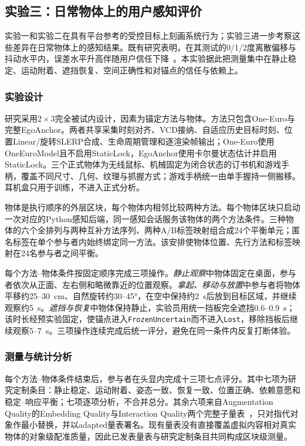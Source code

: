 \documentclass[review]{vgtc}
\begin{document}
\subsection{实验三：日常物体上的用户感知评价}

实验一和实验二在具有平台参考的受控目标上刻画系统行为；实验三进一步考察这些差异在日常物体上的感知结果。既有研究表明，在其测试的0/1/2度离散偏移与抖动水平内，误差水平升高伴随用户信任下降~\cite{gottsacker2024artrust}。本实验据此把测量集中在静止稳定、运动附着、遮挡恢复、空间正确性和对锚点的信任与依赖上。

\subsubsection{实验设计}

研究采用$2 \times 3$完全被试内设计，因素为锚定方法与物体。方法只包含One-Euro与完整EgoAnchor。两者共享采集时刻对齐、VCD接纳、自适应历史目标时刻、位置Linear/旋转SLERP合成、生命周期管理和逐渲染帧输出；One-Euro使用OneEuroModel且不启用StaticLock，EgoAnchor使用卡尔曼状态估计并启用StaticLock。三个正式物体为无线鼠标、机械固定为闭合状态的订书机和游戏手柄，覆盖不同尺寸、几何、纹理与抓握方式；游戏手柄统一由单手握持一侧搬移。耳机盒只用于训练，不进入正式分析。

物体是执行顺序的外层区块，每个物体内相邻比较两种方法。每个物体区块只启动一次对应的Python感知后端，同一感知会话服务该物体的两个方法条件。三种物体的六个全排列与两种互补方法序列、两种A/B标签映射组合成24个平衡单元；匿名标签在单个参与者内始终绑定同一方法。该安排使物体位置、先行方法和标签映射在24名参与者之间平衡。

每个方法--物体条件按固定顺序完成三项操作。\emph{静止观察}中物体固定在桌面，参与者依次从正面、左右侧和略微靠近的位置观察。\emph{拿起、移动与放置}中参与者将物体平移约25--30~cm、自然旋转约30--45°，在空中保持约2~s后放到目标区域，并继续观察约5~s。\emph{遮挡与恢复}中物体保持静止，实验员用统一挡板完全遮挡0.6--0.9~s；该时长经预实验固定，使锚点进入\texttt{FrozenUncertain}而不进入\texttt{Lost}，移除挡板后继续观察5--7~s。三项操作连续完成后统一评分，避免在同一条件内反复打断体验。

\subsubsection{测量与统计分析}

每个方法--物体条件结束后，参与者在头显内完成十三项七点评分。其中七项为研究定制条目：静止稳定、运动附着、姿态一致、恢复一致、位置正确、依赖意愿和稳定--响应平衡；七项逐项分析，不合并总分。其余六项来自Augmentation Quality的Embedding Quality与Interaction Quality两个完整子量表~\cite{schein2025aq}，只对指代对象作最小替换，并以adapted量表署名。现有量表没有直接覆盖虚拟内容相对真实物体的对象级配准质量，因此已发表量表与研究定制条目共同构成区块级测量。
\end{document}
